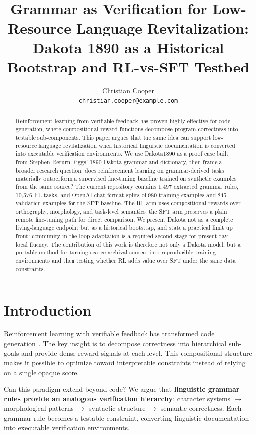 \documentclass{article}
\title{Grammar as Verification for Low-Resource Language Revitalization: Dakota 1890 as a Historical Bootstrap and RL-vs-SFT Testbed}
\author{
  Christian Cooper \\
  \texttt{christian.cooper@example.com} \\
}
\begin{document}
\maketitle

\begin{abstract}
Reinforcement learning from verifiable feedback has proven highly effective for code generation, where compositional reward functions decompose program correctness into testable sub-components. This paper argues that the same idea can support low-resource language revitalization when historical linguistic documentation is converted into executable verification environments. We use Dakota1890 as a proof case built from Stephen Return Riggs' 1890 Dakota grammar and dictionary, then frame a broader research question: does reinforcement learning on grammar-derived tasks materially outperform a supervised fine-tuning baseline trained on synthetic examples from the same source? The current repository contains 1,497 extracted grammar rules, 10,576 RL tasks, and OpenAI chat-format splits of 980 training examples and 245 validation examples for the SFT baseline. The RL arm uses compositional rewards over orthography, morphology, and task-level semantics; the SFT arm preserves a plain remote fine-tuning path for direct comparison. We present Dakota not as a complete living-language endpoint but as a historical bootstrap, and state a practical limit up front: community-in-the-loop adaptation is a required second stage for present-day local fluency. The contribution of this work is therefore not only a Dakota model, but a portable method for turning scarce archival sources into reproducible training environments and then testing whether RL adds value over SFT under the same data constraints.
\end{abstract}

\section{Introduction}

Reinforcement learning with verifiable feedback has transformed code generation~\cite{chen2021evaluating,li2022competition}. The key insight is to decompose correctness into hierarchical sub-goals and provide dense reward signals at each level. This compositional structure makes it possible to optimize toward interpretable constraints instead of relying on a single opaque score.

Can this paradigm extend beyond code? We argue that \textbf{linguistic grammar rules provide an analogous verification hierarchy}: character systems $\rightarrow$ morphological patterns $\rightarrow$ syntactic structure $\rightarrow$ semantic correctness. Each grammar rule becomes a testable constraint, converting linguistic documentation into executable verification environments.
\end{document}
